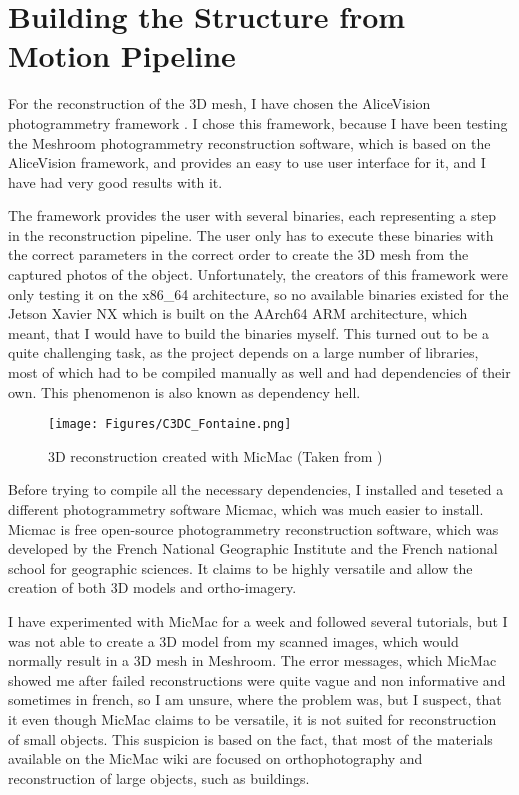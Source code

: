 \section{Building the Structure from Motion Pipeline}

For the reconstruction of the 3D mesh, I have chosen the AliceVision photogrammetry framework \cite{Moulon2012, Jancosek2011}.
I chose this framework, because I have been testing the Meshroom photogrammetry reconstruction software, which is based on the AliceVision framework, and provides an easy to use user interface for it, and I have had very good results with it.

The framework provides the user with several binaries, each representing a step in the reconstruction pipeline.
The user only has to execute these binaries with the correct parameters in the correct order to create the 3D mesh from the captured photos of the object.
Unfortunately, the creators of this framework were only testing it on the x86\_64 architecture, so no available binaries existed for the Jetson Xavier NX which is built on the AArch64 ARM architecture, which meant, that I would have to build the binaries myself.
This turned out to be a quite challenging task, as the project depends on a large number of libraries, most of which had to be compiled manually as well and had dependencies of their own.
This phenomenon is also known as dependency hell.

\begin{figure}[h!]
	\centering
	\texttt{[image: Figures/C3DC\_Fontaine.png]}	
	\caption{3D reconstruction created with MicMac (Taken from \cite{micmac_fontaine})}
\end{figure}

Before trying to compile all the necessary dependencies, I installed and teseted a different photogrammetry software Micmac, which was much easier to install.
Micmac is free open-source photogrammetry reconstruction software, which was developed by the French National Geographic Institute and the French national school for geographic sciences. \cite{micmac_2017}
It claims to be highly versatile and allow the creation of both 3D models and ortho-imagery.

I have experimented with MicMac for a week and followed several tutorials, but I was not able to create a 3D model from my scanned images, which would normally result in a 3D mesh in Meshroom.
The error messages, which MicMac showed me after failed reconstructions were quite vague and non informative and sometimes in french, so I am unsure, where the problem was, but I suspect, that it even though MicMac claims to be versatile, it is not suited for reconstruction of small objects.
This suspicion is based on the fact, that most of the materials available on the MicMac wiki are focused on orthophotography and reconstruction of large objects, such as buildings.


